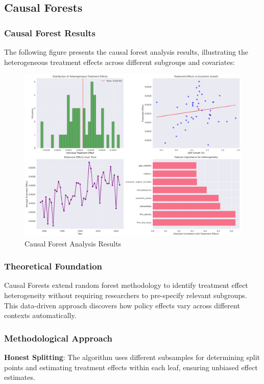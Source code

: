 \subsection{Causal Forests}\label{subsec:cforests}

\subsubsection{Causal Forest Results}
The following figure presents the causal forest analysis results, illustrating the heterogeneous treatment effects across different subgroups and covariates:

\begin{figure}[H]
    \centering
    \includegraphics[width=\textwidth]{figures/causal_forest_results.png}
    \caption{Causal Forest Analysis Results}
    \label{fig:causal_forest_results}
\end{figure}


\subsubsection{Theoretical Foundation}
Causal Forests extend random forest methodology to identify treatment effect heterogeneity without requiring researchers to pre-specify relevant subgroups. This data-driven approach discovers how policy effects vary across different contexts automatically.

\subsubsection{Methodological Approach}
\textbf{Honest Splitting}: The algorithm uses different subsamples for determining split points and estimating treatment effects within each leaf, ensuring unbiased effect estimates.

